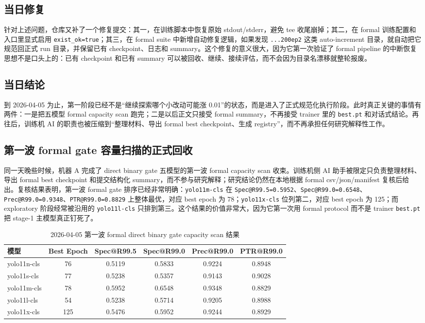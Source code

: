 \documentclass[UTF8,12pt]{ctexart}
\begin{document}
\subsection{当日修复}
针对上述问题，仓库又补了一个修复提交：其一，在训练脚本中恢复原始 stdout/stderr，避免 tee 收尾崩掉；其二，在 formal 训练配置和入口里显式启用 \texttt{exist\_ok=true}；其三，在 formal suite 中新增自动修复逻辑，如果发现 \texttt{...200ep2} 这类 auto-increment 目录，就自动把它规范回正式 run 目录，并保留已有 checkpoint、日志和 summary。这个修复的意义很大，因为它第一次验证了 formal pipeline 的中断恢复思想不是口头上的：已有 checkpoint 和已有 summary 可以被回收、继续、接续评估，而不会因为目录名漂移就整轮报废。

\subsection{当日结论}
到 2026-04-05 为止，第一阶段已经不是“继续探索哪个小改动可能涨 0.01”的状态，而是进入了正式规范化执行阶段。此时真正关键的事情有两件：一是把五模型 formal capacity scan 跑完；二是以后正文只接受 formal summary，不再接受 trainer 里的 \texttt{best.pt} 和对话式结论。再往后，训练机 AI 的职责也被压缩到“整理材料、导出 formal best checkpoint、生成 registry”，而不再承担任何研究解释性工作。

\subsection{第一波 formal gate 容量扫描的正式回收}
同一天晚些时候，机器 A 完成了 direct binary gate 五模型的第一波 formal capacity scan 收束。训练机侧 AI 助手被限定只负责整理材料、导出 formal best checkpoint 和提交结构化 summary，而不参与研究解释；研究结论仍然在本地根据 formal csv/json/manifest 复核后给出。复核结果表明，第一波 formal gate 排序已经非常明确：\texttt{yolo11m-cls} 在 \texttt{Spec@R99.5=0.5952}、\texttt{Spec@R99.0=0.6548}、\texttt{Prec@R99.0=0.9348}、\texttt{PTR@R99.0=0.8829} 上整体最优，对应 best epoch 为 78；\texttt{yolo11x-cls} 位列第二，对应 best epoch 为 125；而 exploratory 阶段经常被沿用的 \texttt{yolo11l-cls} 只排到第三。这个结果的价值非常大，因为它第一次用 formal protocol 而不是 trainer \texttt{best.pt} 把 stage-1 主模型真正钉死了。

\begin{table}[htbp]
    \centering
    \small
    \caption{2026-04-05 第一波 formal direct binary gate capacity scan 结果}
    \begin{tabular}{lccccc}
        \toprule
        模型 & Best Epoch & Spec@R99.5 & Spec@R99.0 & Prec@R99.0 & PTR@R99.0 \\
        \midrule
        yolo11n-cls & 76  & 0.5119 & 0.5833 & 0.9224 & 0.8948 \\
        yolo11s-cls & 77  & 0.5238 & 0.5357 & 0.9143 & 0.9028 \\
        yolo11m-cls & 78  & 0.5952 & 0.6548 & 0.9348 & 0.8829 \\
        yolo11l-cls & 54  & 0.5238 & 0.5714 & 0.9205 & 0.8988 \\
        yolo11x-cls & 125 & 0.5476 & 0.5952 & 0.9244 & 0.8929 \\
        \bottomrule
    \end{tabular}
\end{table}
\end{document}
